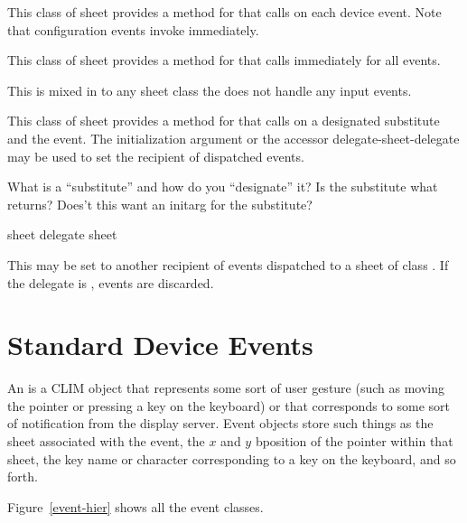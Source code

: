 
This class of sheet provides a method for  that calls
 on each device event.  Note that configuration events invoke
 immediately.


This class of sheet provides a method for  that calls
 immediately for all events.


This is mixed in to any sheet class the does not handle any input events.


This class of sheet provides a method for  that calls
 on a designated substitute and the event.  The
initialization argument  or the accessor {delegate-sheet-delegate}
may be used to set the recipient of dispatched events.

 {What is a ``substitute'' and how do you ``designate'' it?  Is the
substitute what  returns?  Does't this want an
initarg for the substitute?}

 {sheet}
 {delegate sheet}

This may be set to another recipient of events dispatched to a sheet of class
.  If the delegate is , events are
discarded.


\section {Standard Device Events}

An  is a CLIM object that represents some sort of user gesture
(such as moving the pointer or pressing a key on the keyboard) or that
corresponds to some sort of notification from the display server.  Event objects
store such things as the sheet associated with the event, the $x$ and $y$
bposition of the pointer within that sheet, the key name or character
corresponding to a key on the keyboard, and so forth.

Figure~\ref{event-hier} shows all the event classes.

